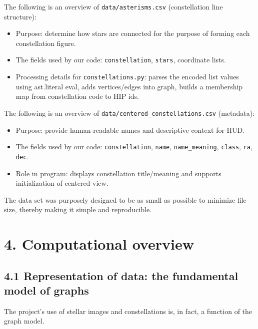 \documentclass[11pt]{article}
\begin{document}
The following is an overview of \texttt{data/asterisms.csv} (constellation line structure):
\begin{itemize}
    \item Purpose: determine how stars are connected for the purpose of forming each constellation figure.
    \item The fields used by our code: \texttt{constellation}, \texttt{stars}, coordinate lists.
    \item Processing details for \texttt{constellations.py}: parses the encoded list values using ast.literal eval, adds vertices/edges into graph, builds a membership map from constellation code to HIP ids.
\end{itemize}

The following is an overview of \texttt{data/centered\_constellations.csv} (metadata):
\begin{itemize}
    \item Purpose: provide human-readable names and descriptive context for HUD.
    \item The fields used by our code: \texttt{constellation}, \texttt{name}, \texttt{name\_meaning}, \texttt{class}, \texttt{ra}, \texttt{dec}.
    \item Role in program: displays constellation title/meaning and supports initialization of centered view.
\end{itemize}

The data set was purposely designed to be as small as possible to minimize file size, thereby making it simple and reproducible.

\section*{4. Computational overview}

\subsection*{4.1 Representation of data: the fundamental model of graphs}

The project's use of stellar images and constellations is, in fact, a function of the graph model.
\end{document}
